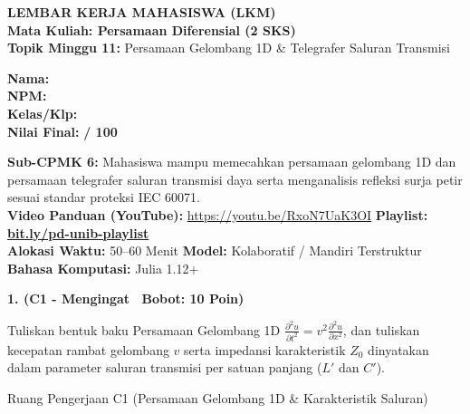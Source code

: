\documentclass[10pt,a4paper]{article}
\begin{document}
\noindent\begin{minipage}[c]{0.68\textwidth}%
  {\large\textbf{\color{unibblue}LEMBAR KERJA MAHASISWA (LKM)}}\\[1mm]
  {\normalsize\textbf{Mata Kuliah: Persamaan Diferensial (2 SKS)}}\\[0.5mm]
  {\small\textbf{Topik Minggu 11:} Persamaan Gelombang 1D \& Telegrafer Saluran Transmisi}%
\end{minipage}%
\hfill%
\begin{minipage}[c]{0.30\textwidth}%
  \begin{tcolorbox}[colback=unibblue!5,colframe=unibblue,boxrule=0.6pt,arc=2pt,left=4pt,right=4pt,top=2pt,bottom=2pt]
    \scriptsize
    \textbf{Nama:} \dotfill\\[1.2mm]
    \textbf{NPM:} \dotfill\\[1.2mm]
    \textbf{Kelas/Klp:} \dotfill\\[1.2mm]
    \textbf{Nilai Final:} \hfill \textbf{/ 100}
  \end{tcolorbox}%
\end{minipage}\par

\vspace{1.5mm}

\begin{tcolorbox}[colback=boxbg,colframe=unibgold!90!black,boxrule=0.6pt,arc=2pt,left=5pt,right=5pt,top=3pt,bottom=3pt,title=\textbf{\scriptsize Capaian Pembelajaran (Sub-CPMK 6) \& Pedoman Evaluasi OBE}]
  \scriptsize
  \textbf{Sub-CPMK 6:} Mahasiswa mampu memecahkan persamaan gelombang 1D dan persamaan telegrafer saluran transmisi daya serta menganalisis refleksi surja petir sesuai standar proteksi IEC 60071.\\
  \textbf{Video Panduan (YouTube):} \url{https://youtu.be/RxoN7UaK3OI} \hfill \textbf{Playlist:} \href{https://www.youtube.com/playlist?list=PLS5oOZWXZeTw}{\color{unibblue}\textbf{bit.ly/pd-unib-playlist}}\\\textbf{Alokasi Waktu:} 50--60 Menit \quad\textbar\quad \textbf{Model:} Kolaboratif / Mandiri Terstruktur \quad\textbar\quad \textbf{Bahasa Komputasi:} Julia 1.12+
\end{tcolorbox}

\vspace{1mm}

\noindent\textbf{1. (C1 - Mengingat \textbar\ Bobot: 10 Poin)}\par\vspace{0.5mm}
{\footnotesize Tuliskan bentuk baku Persamaan Gelombang 1D $\frac{\partial^2 u}{\partial t^2} = v^2 \frac{\partial^2 u}{\partial x^2}$, dan tuliskan kecepatan rambat gelombang $v$ serta impedansi karakteristik $Z_0$ dinyatakan dalam parameter saluran transmisi per satuan panjang ($L'$ dan $C'$).}
\begin{answerbox}{Ruang Pengerjaan C1 (Persamaan Gelombang 1D \& Karakteristik Saluran)}
  \vspace{2.0cm}
\end{answerbox}
\end{document}
